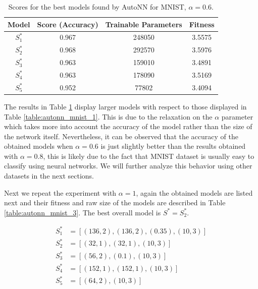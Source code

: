 \documentclass[journal]{IEEEtran}
\begin{document}
\begin{table}[!htb]
\begin{center}
\begin{tabular}{| c | c | c | c |}
\hline
Model & Score (Accuracy) & Trainable Parameters & Fitness\\
\hline
$S^*_1$ & 0.967 & 248050 & 3.5575\\
$S^*_2$ & 0.968 & 292570 & 3.5976\\
$S^*_3$ & 0.963 & 159010 & 3.4891\\
$S^*_4$ & 0.963 & 178090 & 3.5169\\
$S^*_5$ & 0.952 & 77802 & 3.4094\\
\hline
\end{tabular}
\end{center}
\caption{Scores for the best models found by AutoNN for MNIST, $\alpha = 0.6$.}
\label{table:autonn_mnist_2}
\end{table}

The results in Table \ref{table:autonn_mnist_2} display larger models with respect to those displayed in Table \ref{table:autonn_mnist_1}. This is due to the relaxation on the $\alpha$ parameter which takes more into account the accuracy of the model rather than the size of the network itself. Nevertheless, it can be observed that the accuracy of the obtained models when $\alpha=0.6$ is just slightly better than the results obtained with $\alpha=0.8$, this is likely due to the fact that MNIST dataset is usually easy to classify using neural networks. We will further analyze this behavior using other datasets in the next sections.

Next we repeat the experiment with $\alpha = 1$, again the obtained models are listed next and their fitness and raw size of the models are described in Table \ref{table:autonn_mnist_3}. The best overall model is $S^* = S^*_2$.

\begin{align*}
S^*_1 & = \left[ (136, 2), (136, 2), (0.35), (10, 3) \right] \\
S^*_2 & = \left[ (32, 1), (32, 1), (10, 3) \right] \\
S^*_3 & = \left[ (56, 2), (0.1), (10, 3) \right] \\
S^*_4 & = \left[ (152, 1), (152, 1), (10, 3) \right] \\
S^*_5 & = \left[ (64, 2),  (10, 3) \right] \\
\end{align*}
\end{document}
